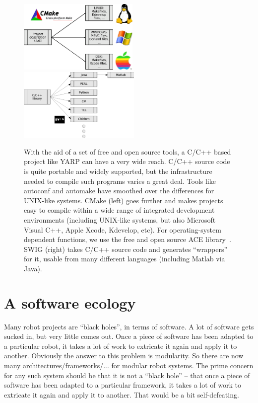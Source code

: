 

\begin{figure}[t]
\begin{center}
\includegraphics[height=3.5cm]{fig-cmake}
\ \ \ \ \ \ 
\includegraphics[height=3.5cm]{fig-swig}
\caption{
%
\label{fig:build}
%
With the aid of a set of free and open source tools, 
a C/C++ based project like YARP can have a very
wide reach.
%
C/C++ source code is quite portable and widely supported, but the
infrastructure needed to compile such programs varies a great 
deal.  Tools like autoconf and automake have smoothed over
the differences for UNIX-like systems. CMake (left) goes
further and makes projects easy to compile within a
wide range of integrated development environments
(including UNIX-like systems, but also Microsoft Visual C++,
Apple Xcode, Kdevelop, etc).
%
For operating-system dependent functions, we use the free
and open source ACE library~\cite{ACEBook}.
%
SWIG (right) takes C/C++ source code and generates ``wrappers''
for it, usable from many different languages (including Matlab
via Java).
%
%
}
\end{center}
\end{figure}


\section{A software ecology}




Many robot projects are ``black holes'', in terms of software.  A lot
of software gets sucked in, but very little comes out.  Once a piece
of software has been adapted to a particular robot, it takes a lot
of work to extricate it again and apply it to another.
%
Obviously the answer to this problem is modularity.  So there are 
now many architectures/frameworks/... for modular robot systems.
The prime concern for any such system should be that it is not
a ``black hole'' -- that once a piece of software has been adapted
to a particular framework, it takes a lot of work to extricate it
again and apply it to another.  That would be a bit self-defeating.


